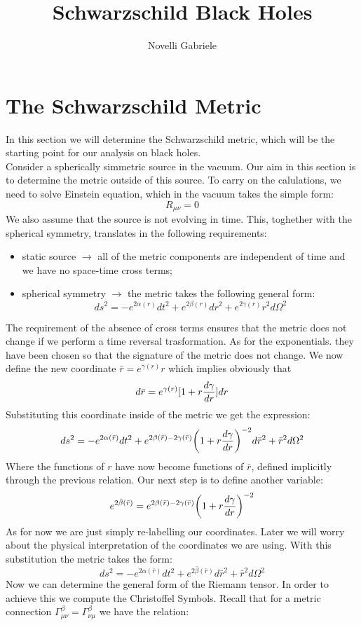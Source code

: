 \documentclass[]{article}
\title{Schwarzschild Black Holes}
\author{Novelli Gabriele}
\date{ }
\theoremstyle{definition}
\theoremstyle{Theorem}
\theoremstyle{definition}
\theoremstyle{definition}
\theoremstyle{definition}
\begin{document}
\maketitle

\section{The Schwarzschild Metric}
In this section we will determine the Schwarzschild metric, which will be the starting point for our analysis on black holes.\\
Consider a spherically simmetric source in the vacuum. Our aim in this section is to determine the metric outside of this source. To carry on the calulations, we need to solve Einstein equation, which in the vacuum takes the simple form:
$$R_{\mu\nu}=0$$
We also assume that the source is not evolving in time. This, toghether with the spherical symmetry, translates in the following requirements: 
\begin{itemize}
	\item static source $\rightarrow$ all of the metric components are independent of time and we have no space-time cross terms;
	\item spherical symmetry $\rightarrow$ the metric takes the following general form:
	$$ds^2=-e^{2\alpha(r)}dt^2+e^{2\beta(r)}dr^2+e^{2\gamma(r)}r^2d\Omega^2$$
\end{itemize}
The requirement of the absence of cross terms ensures that the metric does not change if we perform a time reversal trasformation. As for the exponentials. they have been chosen so that the signature of the metric does not change. We now define the new coordinate $\bar{r}=e^{\gamma(r)}r$ which implies obviously that $$d\bar{r}=e^{\gamma(r)}[1+r{d\gamma\over dr}]dr$$
Substituting this coordinate inside of the metric we get the expression:
$$ds^2=-e^{2\alpha(\bar{r})}dt^2+e^{2\beta(\bar{r})-2\gamma(\bar{r})}\bigg(1+r{d\gamma\over dr}\bigg)^{-2}d\bar{r}^2+\bar{r}^2d\Omega^2$$
Where the functions of $r$ have now become functions of $\bar{r}$, defined implicitly through the previous relation. Our next step is to define another variable:
$$e^{2\bar{\beta}(\bar{r})}=e^{2\beta(\bar{r})-2\gamma(\bar{r})}\bigg(1+r{d\gamma\over dr}\bigg)^{-2}$$ 
As for now we are just simply re-labelling our coordinates. Later we will worry about the physical interpretation of the coordinates we are using. With this substitution the metric takes the form:
$$ds^2=-e^{2\alpha(\bar{r})}dt^2+e^{2\bar\beta(\bar{r})}d\bar{r}^2+\bar{r}^2d\Omega^2$$
Now we can determine the general form of the Riemann tensor. In order to achieve this we compute the Christoffel Symbols. Recall that for a metric connection $\Gamma_{\mu\nu}^\beta=\Gamma_{\nu\mu}^\beta$ we have the relation:
\end{document}
